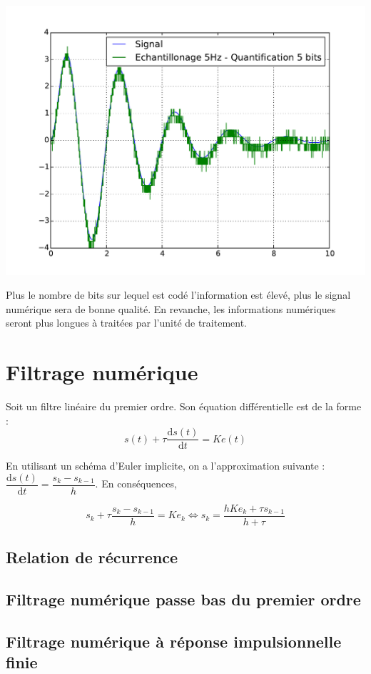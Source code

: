 \documentclass[10pt,fleqn]{article} %
\begin{document}
\begin{minipage}[c]{.32\linewidth}
\begin{center}
\includegraphics[width=\textwidth]{images/quan_3}
\end{center}
\end{minipage}

Plus le nombre de bits sur lequel est codé l'information est élevé, plus le signal numérique sera de bonne qualité. En revanche, les informations numériques seront plus longues à traitées par l'unité de traitement.

\section{Filtrage numérique}

Soit un filtre linéaire du premier ordre. Son équation différentielle est de la forme :
$$
s(t)+\tau \dfrac{\text{d} s(t) }{\text{d}t} = K e(t)
$$

En utilisant un schéma d'Euler implicite, on a l'approximation suivante : $\dfrac{\text{d} s(t) }{\text{d}t} = \dfrac{s_{k}-s_{k-1}}{h}$. En conséquences, 

$$
s_k+\tau \dfrac{s_{k}-s_{k-1}}{h} = K e_k \Leftrightarrow 
s_k = \dfrac{h K e_k+\tau s_{k-1}}{h+\tau}
$$


\subsection{Relation de récurrence}
\subsection{Filtrage numérique passe bas du premier ordre}
\subsection{Filtrage numérique à réponse impulsionnelle finie}
\begin{thebibliography}{2}
\end{thebibliography}
\end{document}
